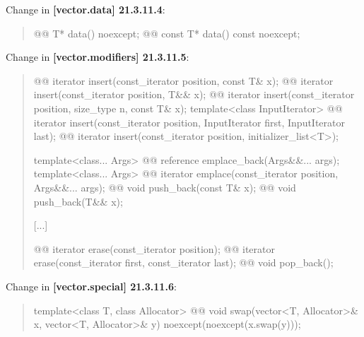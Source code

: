 \documentclass{wg21}
\begin{document}
Change in \textbf{[vector.data] 21.3.11.4}:
\begin{quote}
\begin{itemdecl}
@@ T*         data() noexcept;
@@ const T*   data() const noexcept;
\end{itemdecl}
\end{quote}

Change in \textbf{[vector.modifiers] 21.3.11.5}:
\begin{quote}
\begin{itemdecl}
@@ iterator insert(const_iterator position, const T& x);
@@ iterator insert(const_iterator position, T&& x);
@@ iterator insert(const_iterator position, size_type n, const T& x);
template<class InputIterator>
  @@ iterator insert(const_iterator position, InputIterator first, InputIterator last);
@@ iterator insert(const_iterator position, initializer_list<T>);

template<class... Args> @@ reference emplace_back(Args&&... args);
template<class... Args> @@ iterator emplace(const_iterator position, Args&&... args);
@@ void push_back(const T& x);
@@ void push_back(T&& x);
\end{itemdecl}
[...]
\begin{itemdecl}
@@ iterator erase(const_iterator position);
@@ iterator erase(const_iterator first, const_iterator last);
@@ void pop_back();
\end{itemdecl}
\end{quote}

Change in \textbf{[vector.special] 21.3.11.6}:
\begin{quote}
\begin{itemdecl}
template<class T, class Allocator>
  @@ void swap(vector<T, Allocator>& x, vector<T, Allocator>& y)
    noexcept(noexcept(x.swap(y)));
\end{itemdecl}
\end{quote}
\end{document}
